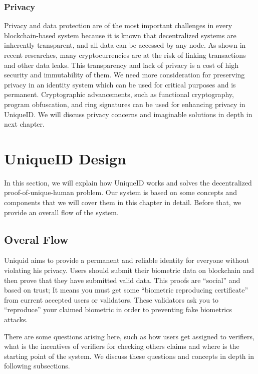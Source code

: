 \documentclass[conference]{IEEEtran}
\begin{document}
\subsubsection{Privacy}
Privacy and data protection are of the most important challenges in every blockchain-based system because it is known that decentralized systems are inherently transparent, and all data can be accessed by any node. As shown in recent researches, many cryptocurrencies are at the risk of linking transactions and other data leaks. This transparency and lack of privacy is a cost of high security and immutability of them. We need more consideration for preserving privacy in an identity system which can be used for critical purposes and is permanent. Cryptographic advancements, such as functional cryptography, program obfuscation, and ring signatures can be used for enhancing privacy in UniqueID. We will discuss privacy concerns and imaginable solutions in depth in next chapter.


\section{UniqueID Design}
In this section, we will explain how UniqueID works and solves the decentralized proof-of-unique-human problem. Our system is based on some concepts and components that we will cover them in this chapter in detail. Before that, we provide an overall flow of the system.

\subsection{Overal Flow}

Uniquid aims to provide a permanent and reliable identity for everyone without violating his privacy.  Users should submit their biometric data on blockchain and then prove that they have submitted valid data. This proofs are “social” and based on trust; It means you must get some “biometric reproducing certificate” from current accepted users or validators. These validators ask you to “reproduce” your claimed biometric in order to preventing fake biometrics attacks.


There are some questions arising here, such as how users get assigned to verifiers, what is the incentives of verifiers for checking others claims and where is the starting point of the system. We discuss these questions and concepts in depth in following subsections.
\end{document}
